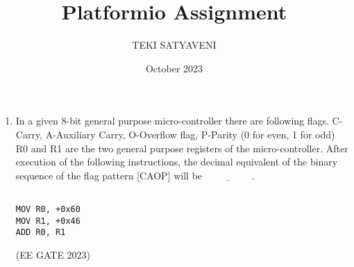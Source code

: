 \documentclass{article}
\title{Platformio Assignment}
\author{TEKI SATYAVENI }
\date{October 2023}
\begin{document}
\maketitle

\begin{enumerate}

\item In a given 8-bit general purpose micro-controller there are following flags.
C-Carry, A-Auxiliary Carry, O-Overflow flag, P-Parity (0 for even, 1 for odd) 
R0 and R1 are the two general purpose registers of the micro-controller.
After execution of the following instructions, the decimal equivalent of the binary 
sequence of the flag pattern [CAOP] will be $\underline{\hspace{2cm}}$.\\

\begin{lstlisting}

MOV R0, +0x60 
MOV R1, +0x46 
ADD R0, R1 

\end{lstlisting}

\hfill{(EE GATE 2023)}

\end{enumerate}
\end{document}
